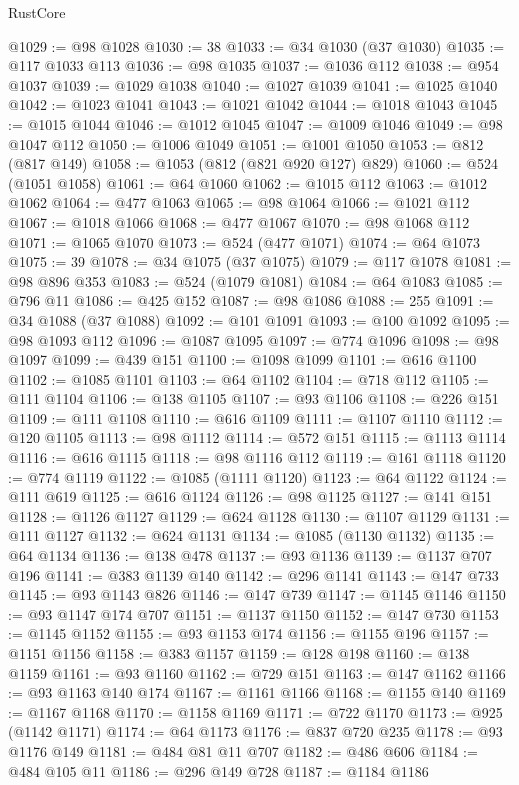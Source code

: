 \begin{lexlean}{RustCore}
\begin{coremodule}
@1029 := @98 @1028
@1030 := 38
@1033 := @34 @1030 (@37 @1030)
@1035 := @117 @1033 @113
@1036 := @98 @1035
@1037 := @1036 @112
@1038 := @954 @1037
@1039 := @1029 @1038
@1040 := @1027 @1039
@1041 := @1025 @1040
@1042 := @1023 @1041
@1043 := @1021 @1042
@1044 := @1018 @1043
@1045 := @1015 @1044
@1046 := @1012 @1045
@1047 := @1009 @1046
@1049 := @98 @1047 @112
@1050 := @1006 @1049
@1051 := @1001 @1050
@1053 := @812 (@817 @149)
@1058 := @1053 (@812 (@821 @920 @127) @829)
@1060 := @524 (@1051 @1058)
@1061 := @64 @1060
@1062 := @1015 @112
@1063 := @1012 @1062
@1064 := @477 @1063
@1065 := @98 @1064
@1066 := @1021 @112
@1067 := @1018 @1066
@1068 := @477 @1067
@1070 := @98 @1068 @112
@1071 := @1065 @1070
@1073 := @524 (@477 @1071)
@1074 := @64 @1073
@1075 := 39
@1078 := @34 @1075 (@37 @1075)
@1079 := @117 @1078
@1081 := @98 @896 @353
@1083 := @524 (@1079 @1081)
@1084 := @64 @1083
@1085 := @796 @11
@1086 := @425 @152
@1087 := @98 @1086
@1088 := 255
@1091 := @34 @1088 (@37 @1088)
@1092 := @101 @1091
@1093 := @100 @1092
@1095 := @98 @1093 @112
@1096 := @1087 @1095
@1097 := @774 @1096
@1098 := @98 @1097
@1099 := @439 @151
@1100 := @1098 @1099
@1101 := @616 @1100
@1102 := @1085 @1101
@1103 := @64 @1102
@1104 := @718 @112
@1105 := @111 @1104
@1106 := @138 @1105
@1107 := @93 @1106
@1108 := @226 @151
@1109 := @111 @1108
@1110 := @616 @1109
@1111 := @1107 @1110
@1112 := @120 @1105
@1113 := @98 @1112
@1114 := @572 @151
@1115 := @1113 @1114
@1116 := @616 @1115
@1118 := @98 @1116 @112
@1119 := @161 @1118
@1120 := @774 @1119
@1122 := @1085 (@1111 @1120)
@1123 := @64 @1122
@1124 := @111 @619
@1125 := @616 @1124
@1126 := @98 @1125
@1127 := @141 @151
@1128 := @1126 @1127
@1129 := @624 @1128
@1130 := @1107 @1129
@1131 := @111 @1127
@1132 := @624 @1131
@1134 := @1085 (@1130 @1132)
@1135 := @64 @1134
@1136 := @138 @478
@1137 := @93 @1136
@1139 := @1137 @707 @196
@1141 := @383 @1139 @140
@1142 := @296 @1141
@1143 := @147 @733
@1145 := @93 @1143 @826
@1146 := @147 @739
@1147 := @1145 @1146
@1150 := @93 @1147 @174 @707
@1151 := @1137 @1150
@1152 := @147 @730
@1153 := @1145 @1152
@1155 := @93 @1153 @174
@1156 := @1155 @196
@1157 := @1151 @1156
@1158 := @383 @1157
@1159 := @128 @198
@1160 := @138 @1159
@1161 := @93 @1160
@1162 := @729 @151
@1163 := @147 @1162
@1166 := @93 @1163 @140 @174
@1167 := @1161 @1166
@1168 := @1155 @140
@1169 := @1167 @1168
@1170 := @1158 @1169
@1171 := @722 @1170
@1173 := @925 (@1142 @1171)
@1174 := @64 @1173
@1176 := @837 @720 @235
@1178 := @93 @1176 @149
@1181 := @484 @81 @11 @707
@1182 := @486 @606
@1184 := @484 @105 @11
@1186 := @296 @149 @728
@1187 := @1184 @1186

\end{coremodule}
\end{lexlean}
